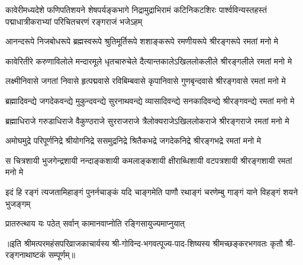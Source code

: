 
{कावेरीमध्यदेशे फणिपतिशयने शेषपर्यङ्कभागे}
{निद्रामुद्राभिरामं कटिनिकटशिरः पार्श्वविन्यस्तहस्तं}
{पद्माधात्रीकराभ्यां परिचितचरणं रङ्गराजं भजेऽहम्}

\fourlineindentedshloka
{आनन्दरूपे  निजबोधरूपे}
{ब्रह्मस्वरूपे श्रुतिमूर्तिरूपे}
{शशाङ्करूपे रमणीयरूपे}
{श्रीरङ्गरूपे रमतां मनो मे}

\fourlineindentedshloka
{कावेरितीरे करुणाविलोले}
{मन्दारमूले धृतचारुचेले}
{दैत्यान्तकालेऽखिललोकलीले}
{श्रीरङ्गलीले रमतां मनो मे}

\fourlineindentedshloka
{लक्ष्मीनिवासे जगतां निवासे}
{हृत्पद्मवासे रविबिम्बवासे}
{कृपानिवासे गुणबृन्दवासे}
{श्रीरङ्गवासे रमतां मनो मे}


\fourlineindentedshloka
{ब्रह्मादिवन्द्ये जगदेकवन्द्ये}
{मुकुन्दवन्द्ये सुरनाथवन्द्ये}
{व्यासादिवन्द्ये सनकादिवन्द्ये}
{श्रीरङ्गवन्द्ये रमतां मनो मे}

\fourlineindentedshloka
{ब्रह्माधिराजे गरुडाधिराजे}
{वैकुण्ठराजे सुरराजराजे}
{त्रैलोक्यराजेऽखिललोकराजे}
{श्रीरङ्गराजे रमतां मनो मे}

\fourlineindentedshloka
{अमोघमुद्रे परिपूर्णनिद्रे}
{श्रीयोगनिद्रे ससमुद्रनिद्रे}
{श्रितैकभद्रे जगदेकनिद्रे}
{श्रीरङ्गभद्रे रमतां मनो मे}


\fourlineindentedshloka
{स चित्रशायी भुजगेन्द्रशायी}
{नन्दाङ्कशायी कमलाङ्कशायी}
{क्षीराब्धिशायी वटपत्रशायी}
{श्रीरङ्गशायी रमतां मनो मे}


\fourlineindentedshloka
{इदं हि रङ्गं त्यजतामिहाङ्गं}
{पुनर्नचाङ्कं यदि चाङ्गमेति}
{पाणौ रथाङ्गं चरणेम्बु गाङ्गं}
{याने विहङ्गं शयने भुजङ्गम्}


{प्रातरुत्थाय यः पठेत्}
{सर्वान् कामानवाप्नोति}
{रङ्गिसायुज्यमाप्नुयात्}

{॥इति श्रीमत्परमहंसपरिव्राजकाचार्यस्य श्री-गोविन्द-भगवत्पूज्य-पाद-शिष्यस्य
श्रीमच्छङ्करभगवतः कृतौ श्री-रङ्गनाथाष्टकं सम्पूर्णम्॥}